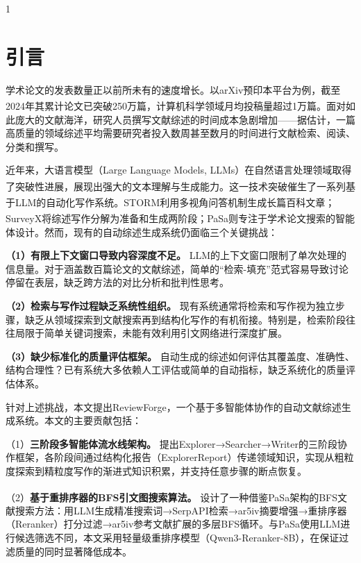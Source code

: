 \documentclass[10.5pt,compsoc,UTF8]{CjC}
\let\zihao\cjczihao
\theoremstyle{mystyle}
\newcommand{\upcite}[1]{\textsuperscript{\cite{#1}}}
\begin{document}
\zihao{5}
\vskip 1mm
\begin{multicols}{1}

\section{\heiti 引言}

学术论文的发表数量正以前所未有的速度增长。以arXiv预印本平台为例，截至2024年其累计论文已突破250万篇，计算机科学领域月均投稿量超过1万篇\upcite{surveyx2025}。面对如此庞大的文献海洋，研究人员撰写文献综述的时间成本急剧增加——据估计，一篇高质量的领域综述平均需要研究者投入数周甚至数月的时间进行文献检索、阅读、分类和撰写。

近年来，大语言模型（Large Language Models, LLMs）在自然语言处理领域取得了突破性进展\upcite{openai2023gpt4,deepseek2024}，展现出强大的文本理解与生成能力。这一技术突破催生了一系列基于LLM的自动化写作系统。STORM\upcite{storm2024}利用多视角问答机制生成长篇百科文章；SurveyX\upcite{surveyx2025}将综述写作分解为准备和生成两阶段；PaSa\upcite{pasa2025}则专注于学术论文搜索的智能体设计。然而，现有的自动综述生成系统仍面临三个关键挑战：

\textbf{（1）有限上下文窗口导致内容深度不足。} LLM的上下文窗口限制了单次处理的信息量。对于涵盖数百篇论文的文献综述，简单的``检索-填充''范式容易导致讨论停留在表层，缺乏跨方法的对比分析和批判性思考。

\textbf{（2）检索与写作过程缺乏系统性组织。} 现有系统通常将检索和写作视为独立步骤，缺乏从领域探索到文献搜索再到结构化写作的有机衔接。特别是，检索阶段往往局限于简单关键词搜索，未能有效利用引文网络进行深度扩展。

\textbf{（3）缺少标准化的质量评估框架。} 自动生成的综述如何评估其覆盖度、准确性、结构合理性？已有系统大多依赖人工评估或简单的自动指标，缺乏系统化的质量评估体系。

针对上述挑战，本文提出ReviewForge，一个基于多智能体协作的自动文献综述生成系统。本文的主要贡献包括：

（1）\textbf{三阶段多智能体流水线架构。} 提出Explorer→Searcher→Writer的三阶段协作框架，各阶段间通过结构化报告（ExplorerReport）传递领域知识，实现从粗粒度探索到精粒度写作的渐进式知识积累，并支持任意步骤的断点恢复。

（2）\textbf{基于重排序器的BFS引文图搜索算法。} 设计了一种借鉴PaSa\upcite{pasa2025}架构的BFS文献搜索方法：用LLM生成精准搜索词→SerpAPI检索→ar5iv摘要增强→重排序器（Reranker）打分过滤→ar5iv参考文献扩展的多层BFS循环。与PaSa使用LLM进行候选筛选不同，本文采用轻量级重排序模型（Qwen3-Reranker-8B），在保证过滤质量的同时显著降低成本。


\end{multicols}
\end{document}
